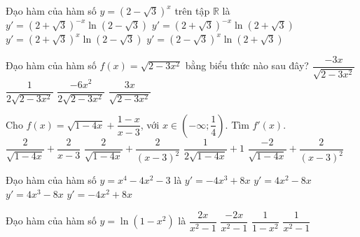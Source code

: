 \begin{ex}%
	Đạo hàm  của hàm số $y=(2-\sqrt{3})^{x}$ trên tập $\mathbb{R}$ là
	 \choice
		 {\True $y'=(2+\sqrt{3})^{-x}\ln(2-\sqrt{3})$}
		{$y'=(2+\sqrt{3})^{-x}\ln(2+\sqrt{3})$} 
		{$y'=(2+\sqrt{3})^{x}\ln(2-\sqrt{3})$} 
		 {$y'=(2-\sqrt{3})^{x}\ln(2+\sqrt{3})$}
\end{ex}

\begin{ex}%
	Đạo hàm của  hàm số $f(x)=\sqrt{2-3x^2}$ bằng biểu thức nào sau đây?
	\choice 
		 {\True $\dfrac{-3x}{\sqrt{2-3x^2}}$}
		 {$\dfrac{1}{2\sqrt{2-3x^2}}$}
		{$\dfrac{-6x^2}{2\sqrt{2-3x^2}}$} 
		{$\dfrac{3x}{\sqrt{2-3x^2}}$} 
\end{ex}

\begin{ex}%
	Cho $f(x)=\sqrt{1-4x}+\dfrac{1-x}{x-3}$, với  $x\in\left(-\infty;\dfrac{1}{4}\right)$. Tìm $f'(x)$.
	\choice 
		{$\dfrac{2}{\sqrt{1-4x}}+\dfrac{2}{x-3}$} 
		 {$\dfrac{2}{\sqrt{1-4x}}+\dfrac{2}{(x-3)^2}$}
		 {$\dfrac{1}{2\sqrt{1-4x}}+1$}
		{\True $\dfrac{-2}{\sqrt{1-4x}}+\dfrac{2}{(x-3)^2}$} 
\end{ex}

\begin{ex}%
	 Đạo hàm của hàm số $y=x^4-4x^2-3$ là
	\choice 
		{$y'=-4x^3+8x$} 
		 {$y'=4x^2-8x$}
		{\True  $y'=4x^3-8x$}
		 {$y'=-4x^2+8x$}
\end{ex}

\begin{ex}%
	Đạo hàm  của hàm số $y=\ln \left(1-x^2\right)$ là
	\choice 
		{\True  $\dfrac{2x}{x^2-1}$}
		{$\dfrac{-2x}{x^2-1}$} 
		 {$\dfrac{1}{1-x^2}$}
		{$\dfrac{1}{x^2-1}$} 
\end{ex}

